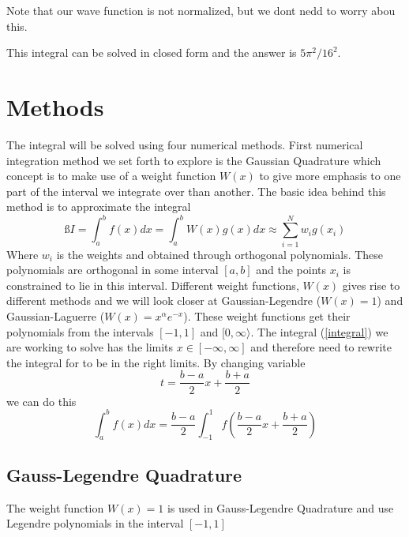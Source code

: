 \documentclass[twoside,twocolumn]{article}
\begin{document}
Note that our wave function is not normalized, but we dont nedd to worry abou this.

This integral can be solved in closed form and the answer is
$5\pi^2/16^2$.


\section{Methods}
The integral will be solved using four numerical methods. First numerical integration method  we set forth to explore is the Gaussian Quadrature which concept is to make use of a weight function $W(x)$ to give more emphasis to one part of the interval we integrate over than another. The basic idea behind this method is to approximate the integral
\begin{equation}ß
   I = \int_{a}^{b}f(x)dx = \int_{a}^{b} W(x)g(x) dx \approx\sum_{i=1}^{N} w_ig(x_i)
\end{equation}
Where $w_i$ is the weights and obtained through orthogonal polynomials. These polynomials are orthogonal in some interval $[a,b]$ and the points $x_i$ is constrained to lie in this interval. Different weight functions, $W(x)$ gives rise to different methods and we will look  closer at Gaussian-Legendre ($W(x) = 1$) and Gaussian-Laguerre ($W(x)  = x^\alpha e^{-x}$). These weight functions get their polynomials from the intervals $[-1,1]$ and $[0,\infty\rangle$. The integral (\ref{integral})
we are working to solve has the limits $x\in[-\infty,\infty]$ and therefore need to rewrite the integral for to be in the right limits. By changing variable
\begin{equation}
		t= \frac{b-a}{2}x + \frac{b+a}{2}
\end{equation}
we can do this
\begin{equation}
		\int_a^b f(x) dx = \frac{b-a}{2} \int_{-1}^1f( \frac{b-a}{2}x + \frac{b+a}{2})
\end{equation}


\subsection{Gauss-Legendre Quadrature}
The weight function $W(x) = 1$ is used in Gauss-Legendre Quadrature and use Legendre polynomials in the interval $[-1,1]$
\end{document}

